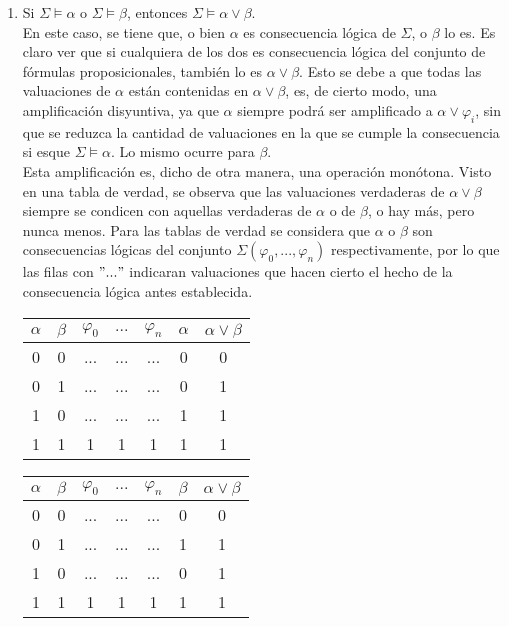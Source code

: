 \documentclass[letter]{article}
\begin{document}
	\begin{pregunta}{2}
		\begin{enumerate}
		\item
			Si $\Sigma \models \alpha$ o $\Sigma \models \beta$, entonces $\Sigma \models \alpha \vee \beta$.\\
			
			En este caso, se tiene que, o bien $\alpha$ es consecuencia lógica de $\Sigma$, o $\beta$ lo es. Es claro ver que si cualquiera de los dos es consecuencia lógica del conjunto de fórmulas proposicionales, también lo es $\alpha \vee \beta$. Esto se debe a que todas las valuaciones de $\alpha$ están contenidas en $\alpha \vee \beta$, es, de cierto modo, una amplificación disyuntiva, ya que $\alpha$ siempre podrá ser amplificado a $\alpha \vee \varphi_i$, sin que se reduzca la cantidad de valuaciones en la que se cumple la consecuencia si esque $\Sigma \models \alpha$. Lo mismo ocurre para $\beta$.\\
			
			Esta amplificación es, dicho de otra manera, una operación monótona. Visto en una tabla de verdad, se observa que las valuaciones verdaderas de $\alpha \vee \beta$ siempre se condicen con aquellas verdaderas de $\alpha$ o de $\beta$, o hay más, pero nunca menos. Para las tablas de verdad se considera que $\alpha$ o $\beta$ son consecuencias lógicas del conjunto $\Sigma(\varphi_0, ..., \varphi_n)$ respectivamente, por lo que las filas con $"..."$ indicaran valuaciones que hacen cierto el hecho de la consecuencia lógica antes establecida.
			
			\begin{center}
				\begin{tabular}{ cc|ccc|cc } 
				$\alpha$ & $\beta$ &$\varphi_0$ & $...$ & $\varphi_n$ & $\alpha$ & $\alpha \vee \beta$\\
				\hline
				0 & 0 & ... & ... & ... & 0 & 0\\
				0 & 1 & ... & ... & ... & 0 & 1\\
				1 & 0 & ... & ... & ... & 1 & 1\\
				\rowcolor{lightblue} 1 & 1 & 1 & 1 & 1 & 1 & 1\\
				\end{tabular}
				\quad
				\quad
				\begin{tabular}{ cc|ccc|cc } 
				$\alpha$ & $\beta$ &$\varphi_0$ & $...$ & $\varphi_n$ & $\beta$ & $\alpha \vee \beta$\\
				\hline
				0 & 0 & ... & ... & ... & 0 & 0\\
				0 & 1 & ... & ... & ... & 1 & 1\\
				1 & 0 & ... & ... & ... & 0 & 1\\
				\rowcolor{lightblue} 1 & 1 & 1 & 1 & 1 & 1 & 1\\
				\end{tabular}
			\end{center}
			

\end{enumerate}
\end{pregunta}
\end{document}
